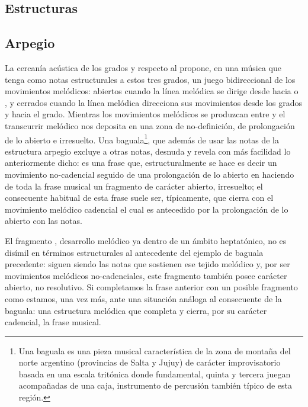 \documentclass[a4paper,12pt]{article}
\begin{document}
\begin{multicols}{2}
\section{Estructuras}\label{sec:estructuras}
  \subsection{Arpegio}\label{subsec:arpegio}
  La cercanía acústica de los grados  y  respecto al  propone, en una música que tenga como notas estructurales a estos tres grados, un juego bidireccional de los movimientos melódicos: abiertos cuando la línea melódica se dirige desde  hacia  o , y cerrados cuando la línea melódica direcciona sus movimientos desde los grados  y  hacia el  grado. Mientras los movimientos melódicos se produzcan entre  y  el transcurrir melódico nos deposita en una zona de no-definición, de prolongación de lo abierto e irresuelto. Una baguala\footnote{Una baguala es una pieza musical característica de la zona de montaña del norte argentino (provincias de Salta y Jujuy) de carácter improvisatorio basada en una escala tritónica donde fundamental, quinta y tercera juegan acompañadas de una caja, instrumento de percusión también típico de esta región.}, que además de usar las notas de la estructura arpegio excluye a otras notas, desnuda y revela con más facilidad lo anteriormente dicho:  es una frase que, estructuralmente se hace  es decir un movimiento no-cadencial  seguido de una prolongación de lo abierto en  haciendo de toda la frase musical un fragmento de carácter abierto, irresuelto; el consecuente habitual de esta frase suele ser, típicamente,  que cierra con el movimiento melódico cadencial  el cual es antecedido por la prolongación de lo abierto con las notas\hbox{.}

  El fragmento , desarrollo melódico ya dentro de un ámbito heptatónico, no es disímil en términos estructurales al antecedente del ejemplo de baguala precedente:  siguen siendo las notas que sostienen ese tejido melódico y, por ser movimientos melódicos no-cadenciales, este fragmento también posee carácter abierto, no resolutivo. Si completamos la frase anterior con un posible fragmento como  estamos, una vez más, ante una situación análoga al consecuente de la baguala: una estructura melódica  que completa y cierra, por su carácter cadencial, la frase musical.


\end{multicols}
\end{document}
